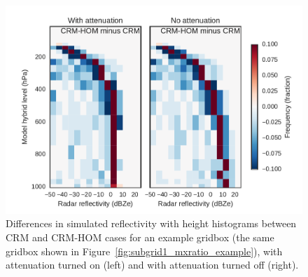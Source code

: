 \begin{figure}[htbp]
\centering
\includegraphics{graphics/subgrid1_cfadDbze94_att-test.pdf}
\caption{\label{fig:subgrid1_cfadDbze94_testatt}Differences in simulated
reflectivity with height histograms between CRM and CRM-HOM cases for an
example gridbox (the same gridbox shown in
Figure~\ref{fig:subgrid1_mxratio_example}), with attenuation turned on
(left) and with attenuation turned off
(right).}\label{fig:subgrid1ux5fcfadDbze94ux5ftestatt}
\end{figure}

